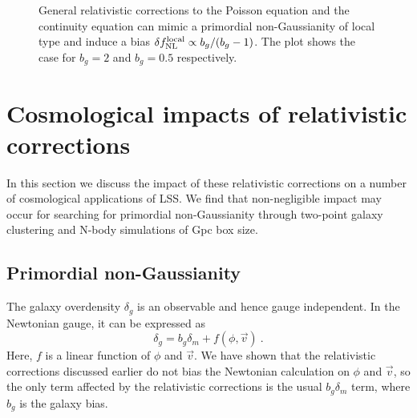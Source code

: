 \documentclass[aps,prl,showpacs,nobibnotes,twocolumn,
nobalancelastpage,superscriptaddress]{revtex4}
\newcommand{\be}{\begin{equation}}
\newcommand{\ee}{\end{equation}}
\newcommand{\bfi}{\begin{figure}
\epsfxsize=9cm
\epsffile}
\newcommand{\efi}{\end{figure}}
\begin{document}
\bfi{fig4.eps}
\caption{General relativistic corrections to the Poisson equation and the
  continuity equation can mimic a primordial non-Gaussianity of local type and
  induce a bias $\delta f_{\rm NL}^{\rm local}\propto b_g/(b_g-1)$. The plot
  shows the case for $b_g=2$ and $b_g=0.5$ respectively.  \label{fig:fnl}}
\efi

\section{Cosmological impacts of relativistic corrections}
In this section we discuss the impact of these relativistic corrections on a
number of cosmological applications of LSS.  We find that non-negligible
impact may occur for searching for primordial non-Gaussianity through
two-point galaxy clustering and N-body simulations of Gpc box size. 

\subsection{Primordial non-Gaussianity}
The  galaxy overdensity $\delta_g$ is an observable and hence gauge independent. In the
Newtonian gauge, it can be expressed as  \cite{Yoo09}
\be
\label{eqn:deltag}
\delta_g=b_g\delta_m+f(\phi,\vec{v})\ .
\ee
Here, $f$ is a linear function of $\phi$ and $\vec{v}$. We have shown that the
relativistic corrections discussed earlier do not bias the Newtonian
calculation on $\phi$ and  $\vec{v}$, so the only term affected  by the
relativistic corrections is the usual
$b_g\delta_m$ term, where $b_g$ is the galaxy bias. 
\end{document}

